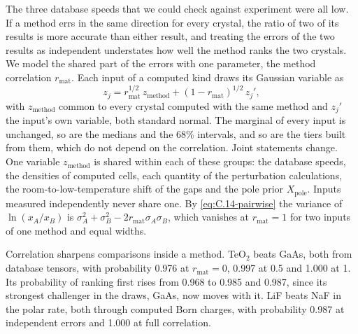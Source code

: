 The three database speeds that we could check against experiment were all low. If a method errs in the same direction for every crystal, the ratio of two of its results is more accurate than either result, and treating the errors of the two results as independent understates how well the method ranks the two crystals. We model the shared part of the errors with one parameter, the method correlation $r_{\mathrm{mat}}$. Each input of a computed kind draws its Gaussian variable as
\begin{equation}
  z_j = r_{\mathrm{mat}}^{1/2}\,z_{\mathrm{method}} + (1 - r_{\mathrm{mat}})^{1/2}\,z_{j}' ,
  \label{eq:17.6-zmethod}
\end{equation}
with $z_{\mathrm{method}}$ common to every crystal computed with the same method and $z_j'$ the input's own variable, both standard normal. The marginal of every input is unchanged, so are the medians and the 68\% intervals, and so are the tiers built from them, which do not depend on the correlation. Joint statements change. One variable $z_{\mathrm{method}}$ is shared within each of these groups: the database speeds, the densities of computed cells, each quantity of the perturbation calculations, the room-to-low-temperature shift of the gaps and the pole prior $X_{\mathrm{pole}}$. Inputs measured independently never share one. By \cref{eq:C.14-pairwise} the variance of $\ln(x_A/x_B)$ is $\sigma_A^2 + \sigma_B^2 - 2r_{\mathrm{mat}}\sigma_A\sigma_B$, which vanishes at $r_{\mathrm{mat}} = 1$ for two inputs of one method and equal widths.

Correlation sharpens comparisons inside a method. TeO$_2$ beats GaAs, both from database tensors, with probability 0.976 at $r_{\mathrm{mat}} = 0$, 0.997 at 0.5 and 1.000 at 1. Its probability of ranking first rises from 0.968 to 0.985 and 0.987, since its strongest challenger in the draws, GaAs, now moves with it. LiF beats NaF in the polar rate, both through computed Born charges, with probability 0.987 at independent errors and 1.000 at full correlation.


